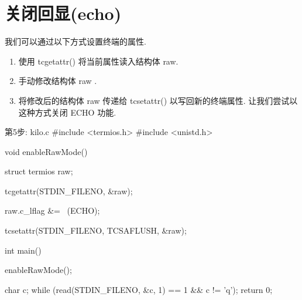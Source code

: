 \documentclass[lang=cn,newtx,10pt,scheme=chinese]{elegantbook}
\begin{document}
\section{关闭回显(echo)}

我们可以通过以下方式设置终端的属性.

\begin{enumerate}
    \item 使用 tcgetattr() 将当前属性读入结构体 raw.
    \item 手动修改结构体 raw .
    \item 将修改后的结构体 raw 传递给 tcsetattr() 以写回新的终端属性. 让我们尝试以这种方式关闭 ECHO 功能.
\end{enumerate}

\begin{mycode}{第5步: kilo.c}
#include <termios.h>
#include <unistd.h>

void enableRawMode() {
  struct termios raw;

  tcgetattr(STDIN_FILENO, &raw);

  raw.c_lflag &= ~(ECHO);

  tcsetattr(STDIN_FILENO, TCSAFLUSH, &raw);
}

int main() {
  enableRawMode();

  char c;
  while (read(STDIN_FILENO, &c, 1) == 1 && c != 'q');
  return 0;
}
\end{mycode}
\end{document}
